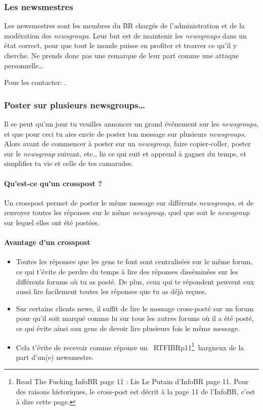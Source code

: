 \subsubsection{Les newsmestres}
Les newsmestres sont les membres du BR chargés de l'administration et de la modération des \emph{newsgroups}. Leur but est de maintenir les
\emph{newsgroups} dans un état correct, pour que tout le monde puisse en profiter et trouver ce qu'il y cherche. Ne prends donc pas une remarque de
leur part comme une attaque personnelle\dots

Pour les contacter: .




\subsubsection{Poster sur plusieurs newsgroups\dots }



Il se peut qu'un jour tu veuilles annoncer un grand événement sur les \emph{newsgroups}, et que pour ceci tu aies envie de poster ton message sur
plusieurs \emph{newsgroups}. Alors avant de commencer à poster sur un \emph{newsgroup}, faire copier-coller, poster sur le \emph{newsgroup} suivant,
etc., lis ce qui suit et apprend à gagner du temps, et simplifier ta vie et celle de tes camarades.

\paragraph{Qu'est-ce qu'un crosspost ?}
Un crosspost permet de poster le même message sur différents \emph{newsgroups}, et de renvoyer toutes les réponses sur le même \emph{newsgroup}, quel
que soit le \emph{newsgroup} sur lequel elles ont été postées.

\paragraph{Avantage d'un crosspost}
\begin{itemize}
 \item Toutes les réponses que les gens te font sont centralisées sur le même forum,
       ce qui t'évite de perdre du temps à lire des réponses disséminées
       sur les différents forums où tu as posté.
       De plus, ceux qui te répondent peuvent eux aussi lire facilement toutes les réponses
       que tu as déjà reçues.
 \item Sur certains clients news, il suffit de lire le message cross-posté sur un forum
       pour qu'il soit marqué comme lu sur tous les autres forums où il a été posté,
       ce qui évite ainsi aux gens de devoir lire plusieurs fois le même message.
 \item Cela t'évite de recevoir comme réponse un \guillemotleft~RTFIBRp11\footnote{Read The Fucking InfoBR page 11 :
       Lis Le Putain d'InfoBR page 11. Pour des raisons historiques, le cross-post est décrit à la page 11
       de l'InfoBR, c'est à dire cette page.}~\guillemotright  hargneux de la part d'un(e) newsmestre.
\end{itemize}

